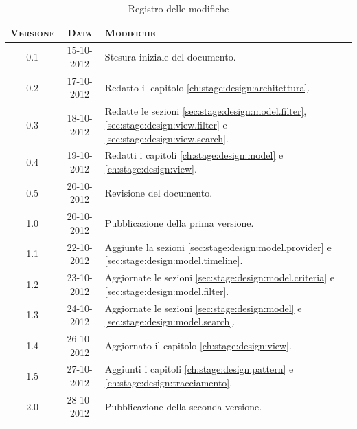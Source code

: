\documentclass[10pt,a4paper,headinclude,footinclude,hidelinks]{scrreprt} %
\begin{document}
    \title{\rmfamily\normalfont{}}
    \author{}
    \date{\today}
    
    \maketitle
    
    \begin{abstract}
        \noindent Il documento riporta le informazioni di progettazione riguardanti l'interfaccia grafica per la visualizzazione e la navigazione dei contenuti.
    \end{abstract}
    
	\begin{table}[ht]
	\centering
	\begin{tabular}{|c|c|l|}
	\hline
	\textsc{Versione} & \textsc{Data} & \textsc{Modifiche} \\ \hline
	0.1 & 15-10-2012 & Stesura iniziale del documento. \\ \hline
	0.2 & 17-10-2012 & Redatto il capitolo \ref{ch:stage:design:architettura}. \\ \hline
	0.3 & 18-10-2012 & Redatte le sezioni \ref{sec:stage:design:model.filter}, \ref{sec:stage:design:view.filter} e \ref{sec:stage:design:view.search}. \\ \hline
	0.4 & 19-10-2012 & Redatti i capitoli \ref{ch:stage:design:model} e \ref{ch:stage:design:view}. \\ \hline
	0.5 & 20-10-2012 & Revisione del documento. \\ \hline
	1.0 & 20-10-2012 & Pubblicazione della prima versione. \\ \hline
	1.1 & 22-10-2012 & Aggiunte la sezioni \ref{sec:stage:design:model.provider} e \ref{sec:stage:design:model.timeline}. \\ \hline
	1.2 & 23-10-2012 & Aggiornate le sezioni \ref{sec:stage:design:model.criteria} e \ref{sec:stage:design:model.filter}. \\ \hline
	1.3 & 24-10-2012 & Aggiornate le sezioni \ref{sec:stage:design:model} e \ref{sec:stage:design:model.search}. \\ \hline
	1.4 & 26-10-2012 & Aggiornato il capitolo \ref{ch:stage:design:view}. \\ \hline
	1.5 & 27-10-2012 & Aggiunti i capitoli \ref{ch:stage:design:pattern} e \ref{ch:stage:design:tracciamento}. \\ \hline
	2.0 & 28-10-2012 & Pubblicazione della seconda versione. \\ \hline
	\end{tabular}
	\caption{Registro delle modifiche}
	\label{tab:stage:wp:workload}
	\end{table}
\end{document}

